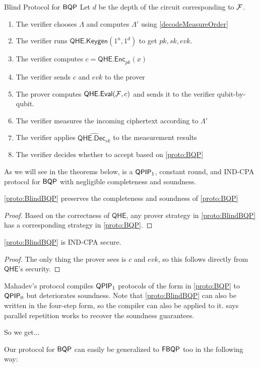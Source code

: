 \begin{protocol}{Blind Protocol for $\operatorname{\mathsf{BQP}}$}
	\label{proto:BlindBQP}
	Let $d$ be the depth of the circuit corresponding to $\mathcal{F}$.
	\begin{enumerate}
		\item The verifier chooses $\Lambda$ and computes $\Lambda'$ using \cref{decodeMeasureOrder}
		\item The verifier runs $\mathsf{QHE.Keygen}(1^n, 1^d)$ to get $pk, sk, evk$.
		\item The verifier computes $c=\mathsf{QHE.Enc}_{pk}(x)$
		\item The verifier sends $c$ and $evk$ to the prover
		\item The prover computes $\mathsf{QHE.Eval}(\mathcal{F}, c)$ and sends it to the verifier qubit-by-qubit.
		\item The verifier measures the incoming ciphertext according to $\Lambda'$
		\item The verifier applies $\widehat{\mathsf{QHE.Dec}_{sk}}$ to the measurement results
		\item The verifier decides whether to accept based on \cref{proto:BQP}
	\end{enumerate}
\end{protocol}

As we will see in the theorems below,  is a $\operatorname{\mathsf{QPIP}}_1$, constant round, and IND-CPA protocol for $\operatorname{\mathsf{BQP}}$ with negligible completeness and soundness.

\begin{thm}
	\cref{proto:BlindBQP} preserves the completeness and soundness of \cref{proto:BQP}
\end{thm}
\begin{proof}
	Based on the correctness of $\mathsf{QHE}$, any prover strategy in \cref{proto:BlindBQP} has a corresponding strategy in \cref{proto:BQP}.
\end{proof}

\begin{thm}
	\cref{proto:BlindBQP} is IND-CPA secure.
\end{thm}
\begin{proof}
	The only thing the prover sees is $c$ and $evk$, so this follows directly from $\mathsf{QHE}$'s security.
\end{proof}

Mahadev's protocol compiles $\operatorname{\mathsf{QPIP}}_1$ protocols of the form in \cref{proto:BQP} to $\operatorname{\mathsf{QPIP}}_0$ but deteriorates soundness.
Note that \cref{proto:BlindBQP} can also be written in the four-step form, so the compiler can also be applied to it.
\cite{parallelrep} says parallel repetition works to recover the soundness guarantees.

So we get...

\begin{rmk}
	Our protocol for $\operatorname{\mathsf{BQP}}$ can easily be generalized to $\operatorname{\mathsf{FBQP}}$ too in the following way:
\end{rmk}

